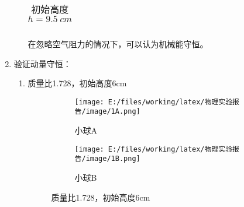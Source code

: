 \documentclass[UTF8]{article}
\begin{document}
\begin{enumerate}
\begin{enumerate}[left=2em, label=\arabic*)]
\begin{table}[H]
\begin{tabularx}{\textwidth}{
                                c |
                                >{\centering\arraybackslash}X
                            }
                            \\ \hline
                            \end{tabularx}
                            \caption{初始高度$h=\SI{9.5}{cm}$}
                            \label{form:95}
                        \end{table}
                        在忽略空气阻力的情况下，可以认为机械能守恒。
                    \end{enumerate}
                \item 验证动量守恒：
                    \begin{enumerate}[left=2em, label=\arabic*)]
                        \item 质量比1.728，初始高度6cm
                            \begin{figure}[H]
                                \centering
                                \begin{subfigure}{0.45\textwidth}
                                    \centering
                                    \texttt{[image: E:/files/working/latex/物理实验报告/image/1A.png]}
                                    \caption{小球A}
                                    \label{fig:1A}
                                \end{subfigure}
                                \hfill
                                \begin{subfigure}{0.45\textwidth}
                                    \centering
                                    \texttt{[image: E:/files/working/latex/物理实验报告/image/1B.png]}
                                    \caption{小球B}
                                    \label{fig:1B}
                                \end{subfigure}
                                \caption{质量比1.728，初始高度6cm}
                                \label{fig:1.728-6}
                            \end{figure}
                            \vfill
                            \begin{table}[H]
                                \centering
                                \begin{tabularx}{\textwidth}{
                                    || >{\centering\arraybackslash}X
                                    | >{\centering\arraybackslash}X
                                    | >{\centering\arraybackslash}X
                                    | >{\centering\arraybackslash}X
}
\end{tabularx}
\end{table}
\end{enumerate}
\end{enumerate}
\end{document}
